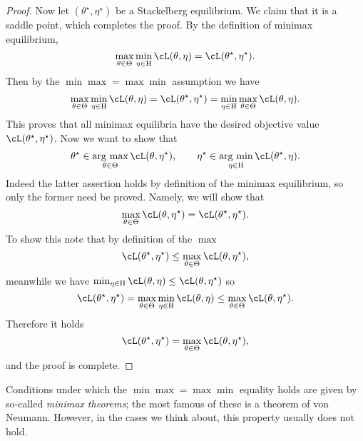 \documentclass[../../book-main.tex]{subfiles}
\begin{document}
\begin{proof}
    Now let \((\theta^{\star}, \eta^{\star})\) be a Stackelberg equilibrium. We claim that it is a saddle point, which completes the proof. By the definition of minimax equilibrium,
    \begin{equation}
        \max_{\theta \in \Theta}\min_{\eta \in \Eta}\cL(\theta, \eta) = \cL(\theta^{\star}, \eta^{\star}).
    \end{equation}
    Then by the \(\min\max = \max\min\) assumption we have
    \begin{equation}
        \max_{\theta \in \Theta}\min_{\eta \in \Eta}\cL(\theta, \eta) = \cL(\theta^{\star}, \eta^{\star}) = \min_{\eta \in \Eta}\max_{\theta \in \Theta}\cL(\theta, \eta).
    \end{equation}
    This proves that all minimax equilibria have the desired objective value \(\cL(\theta^{\star}, \eta^{\star})\). Now we want to show that
    \begin{equation}
        \theta^{\star} \in \argmax_{\theta \in \Theta}\cL(\theta, \eta^{\star}), \qquad \eta^{\star} \in \argmin_{\eta \in \Eta}\cL(\theta^{\star}, \eta).
    \end{equation}
    Indeed the latter assertion holds by definition of the minimax equilibrium, so only the former need be proved. Namely, we will show that
    \begin{equation}
        \max_{\theta \in \Theta}\cL(\theta, \eta^{\star}) = \cL(\theta^{\star}, \eta^{\star}).
    \end{equation}
    To show this note that by definition of the \(\max\)
    \begin{equation}
        \cL(\theta^{\star}, \eta^{\star}) \leq \max_{\theta \in \Theta}\cL(\theta, \eta^{\star}),
    \end{equation}
    meanwhile we have \(\min_{\eta \in \Eta}\cL(\theta, \eta) \leq \cL(\theta, \eta^{\star})\) so
    \begin{equation}
        \cL(\theta^{\star}, \eta^{\star}) = \max_{\theta \in \Theta}\min_{\eta \in \Eta}\cL(\theta, \eta) \leq \max_{\theta \in \Theta}\cL(\theta, \eta^{\star}).
    \end{equation}
    Therefore it holds 
    \begin{equation}
        \cL(\theta^{\star}, \eta^{\star}) = \max_{\theta \in \Theta}\cL(\theta, \eta^{\star}),
    \end{equation}
    and the proof is complete.
\end{proof}
Conditions under which the \(\min\max = \max\min\) equality holds are given by so-called \textit{minimax theorems}; the most famous of these is a theorem of von Neumann. However, in the cases we think about, this property usually does not hold.
\end{document}
